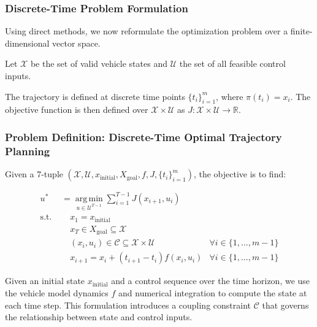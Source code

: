 \subsubsection{Discrete-Time Problem Formulation}

Using direct methods, we now reformulate the optimization problem over a finite-dimensional vector space.

Let $\mathcal{X}$ be the set of valid vehicle states and $\mathcal{U}$ the set of all feasible control inputs.

The trajectory is defined at discrete time points $\{t_i\}_{i=1}^{m}$, where $\pi(t_i) = x_i$.
The objective function is then defined over $\mathcal{X} \times \mathcal{U}$ as $J: \mathcal{X} \times \mathcal{U} \to \mathbb{R}$.

\subsubsection{Problem Definition: Discrete-Time Optimal Trajectory Planning}

Given a 7-tuple $(\mathcal{X}, \mathcal{U}, x_{\text{initial}}, X_{\text{goal}}, f, J, \{t_i\}_{i=1}^{m})$, the objective is to find:

\begin{align}
	u^* & = \underset{u \in \mathcal{U}^{T-1}}{\operatorname{arg\,min}} \sum_{i=1}^{T-1}
	J(x_{i+1}, u_{i})                                                                                                                                      \\ \text{s.t.
	}   & \quad x_1 = x_{\text{initial}}                                                                                                                   \\
	    & \quad x_T \in X_{\text{goal}} \subseteq \mathcal{X}                                                                                              \\
	    & \quad (x_i, u_i) \in \mathcal{C} \subseteq \mathcal{X} \times \mathcal{U}      & \forall i \in \{1, \dots, m-1\} \label{eq:coupling_constraints} \\
	    & \quad x_{i+1} = x_i + (t_{i+1} - t_i) f(x_i, u_i)                              & \forall i \in \{1, \dots, m-1\} \label{eq:discrete_dynamics}
\end{align}

Given an initial state $x_{\text{initial}}$ and a control sequence over the time horizon, we use the vehicle model dynamics $f$ and numerical
integration to compute the state at each time step.
This formulation introduces a coupling constraint $\mathcal{C}$ that governs the relationship between state and control inputs.

